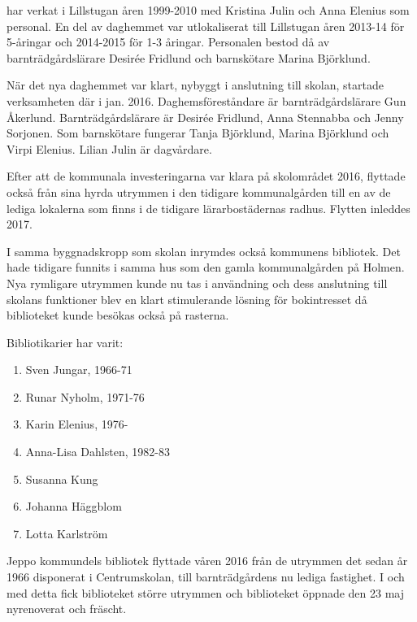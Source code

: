  har verkat i Lillstugan åren 1999-2010 med Kristina Julin och Anna Elenius som personal. En del av daghemmet var utlokaliserat till Lillstugan åren 2013-14 för 5-åringar och 2014-2015 för 1-3 åringar. Personalen bestod då av barnträdgårdslärare Desirée Fridlund och barnskötare Marina Björklund.

När det nya daghemmet var klart, nybyggt i anslutning till skolan, startade verksamheten där i jan. 2016. Daghemsföreståndare är barnträdgårdslärare Gun Åkerlund. Barnträdgårdslärare är Desirée Fridlund, Anna Stennabba och Jenny Sorjonen. Som barnskötare fungerar Tanja Björklund, Marina Björklund och Virpi Elenius. Lilian Julin är dagvårdare.

Efter att de kommunala investeringarna var klara på skolområdet 2016, flyttade också  från sina hyrda utrymmen i den tidigare kommunalgården till en av de lediga lokalerna som finns i de tidigare lärarbostädernas radhus. Flytten inleddes 2017.


I samma byggnadskropp som skolan inrymdes också kommunens bibliotek. Det hade tidigare funnits i samma hus som den gamla kommunalgården på Holmen. Nya rymligare utrymmen kunde nu tas i användning och dess anslutning till skolans funktioner blev en klart stimulerande lösning för bokintresset då biblioteket kunde besökas också på rasterna.

Bibliotikarier har varit:
\begin{enumerate}
  \item Sven Jungar, 1966-71
  \item Runar Nyholm, 1971-76
  \item Karin Elenius, 1976-
  \item Anna-Lisa Dahlsten, 1982-83
  \item Susanna Kung
  \item Johanna Häggblom
  \item Lotta Karlström
\end{enumerate}



Jeppo kommundels bibliotek flyttade våren 2016 från de utrymmen det sedan år 1966 disponerat i Centrumskolan, till barnträdgårdens nu lediga fastighet. I och med detta fick biblioteket större utrymmen och biblioteket öppnade den 23 maj nyrenoverat och fräscht.

